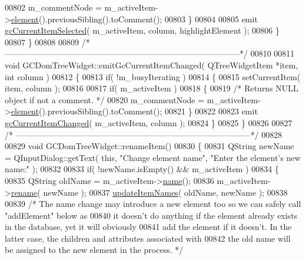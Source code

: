 \begin{DoxyCode}
00802       m\_commentNode = m\_activeItem->\hyperlink{class_g_c_tree_widget_item_a584cad866bdbd94710d31eb77b804d84}{element}().previousSibling().toComment();
00803     \}
00804 
00805     emit \hyperlink{class_g_c_dom_tree_widget_aa4aaa06b56ebf5500fd41253144bd6fd}{gcCurrentItemSelected}( m\_activeItem, column, highlightElement );
00806   \}
00807 \}
00808 
00809 \textcolor{comment}{/*
      --------------------------------------------------------------------------------------*/}
00810 
00811 \textcolor{keywordtype}{void} GCDomTreeWidget::emitGcCurrentItemChanged( QTreeWidgetItem *item, \textcolor{keywordtype}{int} 
      column )
00812 \{
00813   \textcolor{keywordflow}{if}( !m\_busyIterating )
00814   \{
00815     setCurrentItem( item, column );
00816 
00817     \textcolor{keywordflow}{if}( m\_activeItem )
00818     \{
00819       \textcolor{comment}{/* Returns NULL object if not a comment. */}
00820       m\_commentNode = m\_activeItem->\hyperlink{class_g_c_tree_widget_item_a584cad866bdbd94710d31eb77b804d84}{element}().previousSibling().toComment();
00821     \}
00822 
00823     emit \hyperlink{class_g_c_dom_tree_widget_a20238112d91ad7a05e9a762ce2a51589}{gcCurrentItemChanged}( m\_activeItem, column );
00824   \}
00825 \}
00826 
00827 \textcolor{comment}{/*
      --------------------------------------------------------------------------------------*/}
00828 
00829 \textcolor{keywordtype}{void} GCDomTreeWidget::renameItem()
00830 \{
00831   QString newName = QInputDialog::getText( \textcolor{keyword}{this}, \textcolor{stringliteral}{"Change element name"}, \textcolor{stringliteral}{"Enter
       the element's new name:"} );
00832 
00833   \textcolor{keywordflow}{if}( !newName.isEmpty() && m\_activeItem )
00834   \{
00835     QString oldName = m\_activeItem->\hyperlink{class_g_c_tree_widget_item_a3af8c66a690cd55986a38b996a375ba4}{name}();
00836     m\_activeItem->\hyperlink{class_g_c_tree_widget_item_a831acd54bf1060e3ec45a8e46439385a}{rename}( newName );
00837     \hyperlink{class_g_c_dom_tree_widget_a1ec3ed3851e25adf1fac93fb42a4a8a7}{updateItemNames}( oldName, newName );
00838 
00839     \textcolor{comment}{/* The name change may introduce a new element too so we can safely call
       "addElement" below as}
00840 \textcolor{comment}{       it doesn't do anything if the element already exists in the database,
       yet it will obviously}
00841 \textcolor{comment}{       add the element if it doesn't.  In the latter case, the children  and
       attributes associated with}
00842 \textcolor{comment}{       the old name will be assigned to the new element in the process. */}

\end{DoxyCode}
